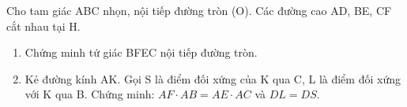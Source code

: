 \begin{ex}
Cho tam giác ABC nhọn, nội tiếp đường tròn (O). Các đường cao AD, BE, CF cắt nhau tại H.
	\begin{enumerate}
		\item[a)] Chứng minh tứ giác BFEC nội tiếp đường tròn.
		\item[b)] Kẻ đường kính AK. Gọi S là điểm đối xứng của K qua C, L là điểm đối xứng với K qua B. Chứng minh: $AF \cdot AB = AE \cdot AC$ và $DL=DS$.
	\end{enumerate}
\end{ex}
